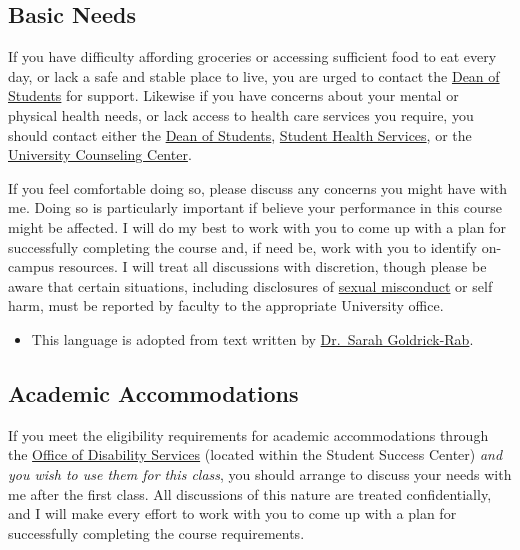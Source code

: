 \documentclass[]{book}
\newenvironment{rmdblock}[1]
  {\begin{shaded*}
  \begin{itemize}
  \renewcommand{\labelitemi}{
    \raisebox{-.7\height}[0pt][0pt]{
      {\setkeys{Gin}{width=3em,keepaspectratio}\texttt{[image: images/\#1]}}
    }
  }
  \item
  }
  {
  \end{itemize}
  \end{shaded*}
  }
\newenvironment{rmdnote}
  {\begin{rmdblock}{note}}
  {\end{rmdblock}}
\begin{document}
\hypertarget{basic-needs}{%
\subsection{Basic Needs}\label{basic-needs}}

If you have difficulty affording groceries or accessing sufficient food to eat every day, or lack a safe and stable place to live, you are urged to contact the \href{https://www.slu.edu/student-development/dean-of-students/index.php}{Dean of Students} for support. Likewise if you have concerns about your mental or physical health needs, or lack access to health care services you require, you should contact either the \href{https://www.slu.edu/student-development/dean-of-students/index.php}{Dean of Students}, \href{https://www.slu.edu/life-at-slu/student-health/index.php}{Student Health Services}, or the \href{https://www.slu.edu/life-at-slu/university-counseling/index.php}{University Counseling Center}.

If you feel comfortable doing so, please discuss any concerns you might have with me. Doing so is particularly important if believe your performance in this course might be affected. I will do my best to work with you to come up with a plan for successfully completing the course and, if need be, work with you to identify on-campus resources. I will treat all discussions with discretion, though please be aware that certain situations, including disclosures of \href{/syllabus/harassment-and-title-ix.html}{sexual misconduct} or self harm, must be reported by faculty to the appropriate University office.

\begin{rmdnote}
This language is adopted from text written by
\href{https://medium.com/@saragoldrickrab/basic-needs-security-and-the-syllabus-d24cc7afe8c9}{Dr.~Sarah
Goldrick-Rab}.
\end{rmdnote}

\hypertarget{academic-accommodations}{%
\subsection{Academic Accommodations}\label{academic-accommodations}}

If you meet the eligibility requirements for academic accommodations through the \href{https://www.slu.edu/life-at-slu/student-success-center/disability-services/index.php}{Office of Disability Services} (located within the Student Success Center) \emph{and you wish to use them for this class}, you should arrange to discuss your needs with me after the first class. All discussions of this nature are treated confidentially, and I will make every effort to work with you to come up with a plan for successfully completing the course requirements.
\end{document}
